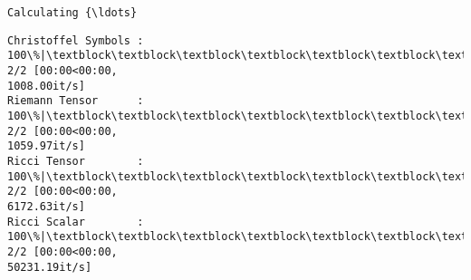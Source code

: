 \documentclass[11pt]{article}
\newcommand{\prompt}[4]{
        {\ttfamily\llap{{\color{#2}[#3]:\hspace{3pt}#4}}\vspace{-\baselineskip}}
    }
\begin{document}
    \begin{Verbatim}[commandchars=\\\{\}]
Calculating {\ldots}
    \end{Verbatim}

    \begin{Verbatim}[commandchars=\\\{\}]
Christoffel Symbols : 100\%|\textblock\textblock\textblock\textblock\textblock\textblock\textblock\textblock\textblock\textblock\textblock\textblock\textblock\textblock\textblock\textblock\textblock\textblock\textblock\textblock\textblock\textblock\textblock\textblock\textblock\textblock\textblock\textblock\textblock\textblock\textblock\textblock\textblock| 2/2 [00:00<00:00,
1008.00it/s]
Riemann Tensor      : 100\%|\textblock\textblock\textblock\textblock\textblock\textblock\textblock\textblock\textblock\textblock\textblock\textblock\textblock\textblock\textblock\textblock\textblock\textblock\textblock\textblock\textblock\textblock\textblock\textblock\textblock\textblock\textblock\textblock\textblock\textblock\textblock\textblock\textblock| 2/2 [00:00<00:00,
1059.97it/s]
Ricci Tensor        : 100\%|\textblock\textblock\textblock\textblock\textblock\textblock\textblock\textblock\textblock\textblock\textblock\textblock\textblock\textblock\textblock\textblock\textblock\textblock\textblock\textblock\textblock\textblock\textblock\textblock\textblock\textblock\textblock\textblock\textblock\textblock\textblock\textblock\textblock| 2/2 [00:00<00:00,
6172.63it/s]
Ricci Scalar        : 100\%|\textblock\textblock\textblock\textblock\textblock\textblock\textblock\textblock\textblock\textblock\textblock\textblock\textblock\textblock\textblock\textblock\textblock\textblock\textblock\textblock\textblock\textblock\textblock\textblock\textblock\textblock\textblock\textblock\textblock\textblock\textblock\textblock| 2/2 [00:00<00:00,
50231.19it/s]
    \end{Verbatim}
 
            
\prompt{Out}{outcolor}{4}{}
    
\end{document}
